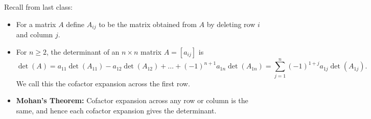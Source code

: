 \documentclass[12pt,letterpaper]{article}
\begin{document}
\thispagestyle{fancy}

Recall from last class:

\begin{itemize}
\item For a matrix $A$ define  $A_{ij}$ to be the matrix obtained from $A$ by deleting row $i$ and column $j$.
\item For $n\geq 2$, the determinant of an $n\times n$ matrix $A=[a_{ij}]$ is
\begin{equation*}
\operatorname{det}(A)= a_{11} \operatorname{det}(A_{11}) - a_{12} \operatorname{det}(A_{12})+\dots + (-1)^{n+1} a_{1n} \operatorname{det}(A_{1n})=\sum_{j=1}^{n}(-1)^{1+j}a_{1j} \operatorname{det}(A_{1j}).
\end{equation*} We call this the cofactor expansion across the first row.
\item {\bf Mohan's Theorem:} Cofactor expansion across any row or column is the same, and hence each cofactor expansion gives the determinant.
\end{itemize}

\newpage
\end{document}
